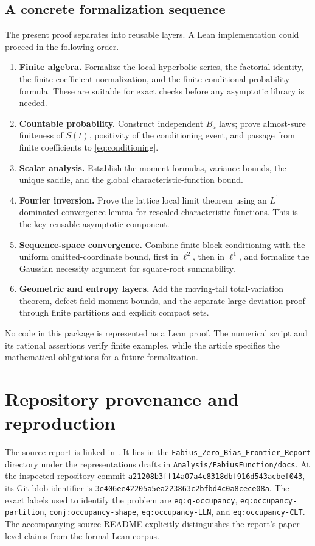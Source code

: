 \documentclass[11pt,a4paper]{article}
\numberwithin{equation}{section}
\theoremstyle{definition}
\theoremstyle{remark}
\begin{document}
\subsection{A concrete formalization sequence}
The present proof separates into reusable layers. A Lean implementation
could proceed in the following order.
\begin{enumerate}
\item \textbf{Finite algebra.} Formalize the local hyperbolic series,
the factorial identity, the finite coefficient normalization, and the
finite conditional probability formula. These are suitable for exact
checks before any asymptotic library is needed.
\item \textbf{Countable probability.} Construct independent $B_a$ laws;
prove almost-sure finiteness of $S(t)$, positivity of the conditioning
event, and passage from finite coefficients to \cref{eq:conditioning}.
\item \textbf{Scalar analysis.} Establish the moment formulas, variance
bounds, the unique saddle, and the global characteristic-function bound.
\item \textbf{Fourier inversion.} Prove the lattice local limit theorem
using an $L^1$ dominated-convergence lemma for rescaled characteristic
functions. This is the key reusable asymptotic component.
\item \textbf{Sequence-space convergence.} Combine finite block
conditioning with the uniform omitted-coordinate bound, first in
$\ell^2$, then in $\ell^1$, and formalize the Gaussian necessity
argument for square-root summability.
\item \textbf{Geometric and entropy layers.} Add the moving-tail
total-variation theorem, defect-field moment bounds, and the separate
large deviation proof through finite partitions and explicit compact
sets.
\end{enumerate}
No code in this package is represented as a Lean proof. The numerical
script and its rational assertions verify finite examples, while the
article specifies the mathematical obligations for a future formalization.

\appendix
\section{Repository provenance and reproduction}
\label{app:provenance}

The source report is linked in \cite{repo-report}. It lies in the
\texttt{Fabius\_Zero\_Bias\_Frontier\_Report} directory under the
representations drafts in \texttt{Analysis/FabiusFunction/docs}.
At the inspected repository commit
\texttt{a21208b3ff14a07a4c8318dbf916d543acbef043}, its Git blob identifier is
\texttt{3e406ee42205a5ea223863c2bfbd4c0a8cece08a}.
The exact labels used to identify the problem are
\texttt{eq:q-occupancy}, \texttt{eq:occupancy-partition},
\texttt{conj:occupancy-shape}, \texttt{eq:occupancy-LLN}, and
\texttt{eq:occupancy-CLT}. The accompanying source README explicitly
distinguishes the report's paper-level claims from the formal Lean corpus.
\end{document}
